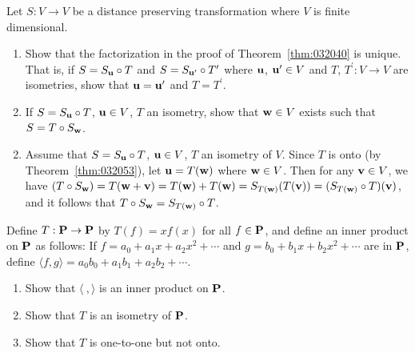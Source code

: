 \begin{multicols}{2}
\begin{ex}
\begin{enumerate}
\end{enumerate}
\end{ex}

\begin{ex} \label{ex:10_4_12}
Let $S : V \to V$ be a distance preserving transformation where $V$ is finite dimensional.

\begin{enumerate}[label={\alph*.}]
\item Show that the factorization in the proof of Theorem~\ref{thm:032040} is unique. That is, if $S = S_{\textbf{u}} \circ T$ and $S = S_{\textbf{u}^\prime} \circ T^\prime$ where $\textbf{u}$, $\textbf{u}^\prime \in V$ and $T$, $T^\prime : V \to V$ are isometries, show that $\textbf{u} = \textbf{u}^\prime$ and $T = T^\prime$.

\item If $S = S_{\textbf{u}} \circ T$, $\textbf{u} \in V$, $T$ an isometry, show that $\textbf{w} \in V$ exists such that $S = T \circ S_{\textbf{w}}$.
\end{enumerate}
\begin{sol}
\begin{enumerate}[label={\alph*.}]
\setcounter{enumi}{1}
\item  Assume that $S = S_{\textbf{u}} \circ T$, $\textbf{u} \in V$, $T$ an isometry of $V$. Since $T$ is onto (by Theorem~\ref{thm:032053}), let $\textbf{u} = T(\textbf{w})$ where $\textbf{w} \in V$. Then for any $\textbf{v} \in V$, we have $(T \circ S_{\textbf{w}}) = T(\textbf{w} + \textbf{v}) = T(\textbf{w}) + T(\textbf{w}) = S_{T(\textbf{w})}(T(\textbf{v})) = (S_{T(\textbf{w})} \circ T)(\textbf{v})$, and it follows that $T \circ S_{\textbf{w}} = S_{T(\textbf{w})} \circ T$.

\end{enumerate}
\end{sol}
\end{ex}

\begin{ex} \label{ex:10_4_13}
Define $T : \textbf{P} \to \textbf{P}$ by $T(f) = xf(x)$ for all $f \in \textbf{P}$, and define an inner product on $\textbf{P}$ as follows: If $f = a_{0} + a_{1}x + a_{2}x^{2} + \cdots$  and $g = b_{0} + b_{1}x + b_{2}x^{2} + \cdots$  are in $\textbf{P}$, define $\langle f, g\rangle = a_{0}b_{0} + a_{1}b_{1} + a_{2}b_{2} + \cdots$.

\begin{enumerate}[label={\alph*.}]
\item Show that $\langle\ , \rangle $ is an inner product on $\textbf{P}$.

\item Show that $T$ is an isometry of $\textbf{P}$.

\item Show that $T$ is one-to-one but not onto.

\end{enumerate}
\end{ex}
\end{multicols}
